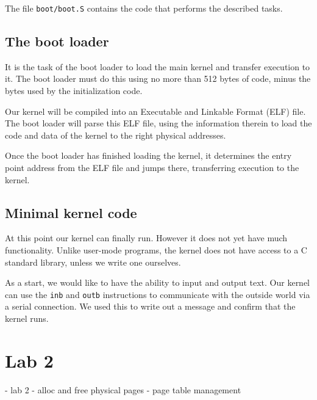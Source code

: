 \documentclass{article}
\begin{document}
The file \texttt{boot/boot.S} contains the code that performs the described
tasks.



\subsection*{The boot loader}
It is the task of the boot loader to load the main kernel and transfer
execution to it. The boot loader must do this using no more than 512 bytes of
code, minus the bytes used by the initialization code.

Our kernel will be compiled into an Executable and Linkable Format (ELF) file.
The boot loader will parse this ELF file, using the information therein to
load the code and data of the kernel to the right physical addresses.


Once the boot loader has finished loading the kernel, it determines the entry
point address from the ELF file and jumps there, transferring execution to the
kernel.

\subsection*{Minimal kernel code}
At this point our kernel can finally run. However it does not yet have much
functionality. Unlike user-mode programs, the kernel does not have access to a
C standard library, unless we write one ourselves.


As a start, we would like to have the ability to input and output text.
Our kernel can use the \texttt{inb} and \texttt{outb} instructions to
communicate with the outside world via a serial connection. We used this to
write out a message and confirm that the kernel runs.







\section*{Lab 2}

- lab 2
	- alloc and free physical pages
	- page table management
\end{document}
